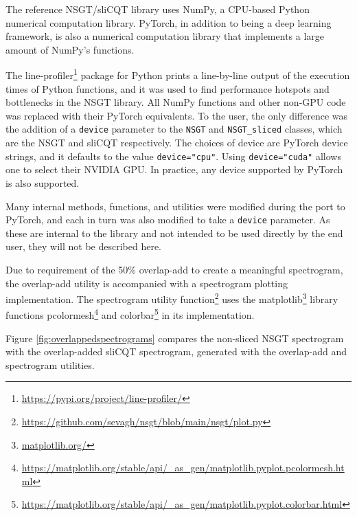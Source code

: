 \documentclass[report.tex]{subfiles}
\begin{document}
The reference NSGT/sliCQT library uses NumPy, a CPU-based Python numerical computation library. PyTorch, in addition to being a deep learning framework, is also a numerical computation library that implements a large amount of NumPy's functions.

The line-profiler\footnote{\url{https://pypi.org/project/line-profiler/}} package for Python prints a line-by-line output of the execution times of Python functions, and it was used to find performance hotspots and bottlenecks in the NSGT library. All NumPy functions and other non-GPU code was replaced with their PyTorch equivalents. To the user, the only difference was the addition of a \Verb#device# parameter to the \Verb#NSGT# and \Verb#NSGT_sliced# classes, which are the NSGT and sliCQT respectively. The choices of device are PyTorch device strings, and it defaults to the value \Verb#device="cpu"#. Using \Verb#device="cuda"# allows one to select their NVIDIA GPU. In practice, any device supported by PyTorch is also supported.

Many internal methods, functions, and utilities were modified during the port to PyTorch, and each in turn was also modified to take a \Verb#device# parameter. As these are internal to the library and not intended to be used directly by the end user, they will not be described here.

Due to requirement of the 50\% overlap-add to create a meaningful spectrogram, the overlap-add utility is accompanied with a spectrogram plotting implementation. The spectrogram utility function\footnote{\url{https://github.com/sevagh/nsgt/blob/main/nsgt/plot.py}} uses the matplotlib\footnote{\url{matplotlib.org/}} library functions pcolormesh\footnote{\url{https://matplotlib.org/stable/api/_as_gen/matplotlib.pyplot.pcolormesh.html}} and colorbar\footnote{\url{https://matplotlib.org/stable/api/_as_gen/matplotlib.pyplot.colorbar.html}} in its implementation.

Figure \ref{fig:overlappedspectrograms} compares the non-sliced NSGT spectrogram with the overlap-added sliCQT spectrogram, generated with the overlap-add and spectrogram utilities.
\end{document}
